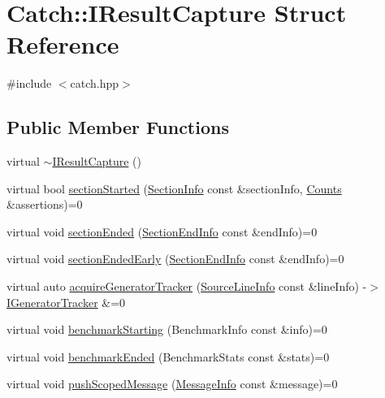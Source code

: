\hypertarget{struct_catch_1_1_i_result_capture}{}\section{Catch\+::I\+Result\+Capture Struct Reference}
\label{struct_catch_1_1_i_result_capture}


{\ttfamily \#include $<$catch.\+hpp$>$}

\subsection*{Public Member Functions}
\begin{DoxyCompactItemize}
\item 
virtual \mbox{\hyperlink{struct_catch_1_1_i_result_capture_a3bd16719d6772b7470887fc36c6d0808}{$\sim$\+I\+Result\+Capture}} ()
\item 
virtual bool \mbox{\hyperlink{struct_catch_1_1_i_result_capture_a5b76ed52badcb64cf374202e12b81a03}{section\+Started}} (\mbox{\hyperlink{struct_catch_1_1_section_info}{Section\+Info}} const \&section\+Info, \mbox{\hyperlink{struct_catch_1_1_counts}{Counts}} \&assertions)=0
\item 
virtual void \mbox{\hyperlink{struct_catch_1_1_i_result_capture_a4e152bc43dc0933684e31fa67a58195d}{section\+Ended}} (\mbox{\hyperlink{struct_catch_1_1_section_end_info}{Section\+End\+Info}} const \&end\+Info)=0
\item 
virtual void \mbox{\hyperlink{struct_catch_1_1_i_result_capture_afcc71eef8ca821ae132cced4a2be6988}{section\+Ended\+Early}} (\mbox{\hyperlink{struct_catch_1_1_section_end_info}{Section\+End\+Info}} const \&end\+Info)=0
\item 
virtual auto \mbox{\hyperlink{struct_catch_1_1_i_result_capture_ab020d111e29ad1cabe1227dcfda712ef}{acquire\+Generator\+Tracker}} (\mbox{\hyperlink{struct_catch_1_1_source_line_info}{Source\+Line\+Info}} const \&line\+Info) -\/$>$ \mbox{\hyperlink{struct_catch_1_1_i_generator_tracker}{I\+Generator\+Tracker}} \&=0
\item 
virtual void \mbox{\hyperlink{struct_catch_1_1_i_result_capture_a264ae12330c74b2daae41715a30d51bf}{benchmark\+Starting}} (Benchmark\+Info const \&info)=0
\item 
virtual void \mbox{\hyperlink{struct_catch_1_1_i_result_capture_a6e5e64f9d94211a888249012ab6cc7fb}{benchmark\+Ended}} (Benchmark\+Stats const \&stats)=0
\item 
virtual void \mbox{\hyperlink{struct_catch_1_1_i_result_capture_a91d154c1e087e383dcde5aad95cb6a05}{push\+Scoped\+Message}} (\mbox{\hyperlink{struct_catch_1_1_message_info}{Message\+Info}} const \&message)=0

\end{DoxyCompactItemize}
